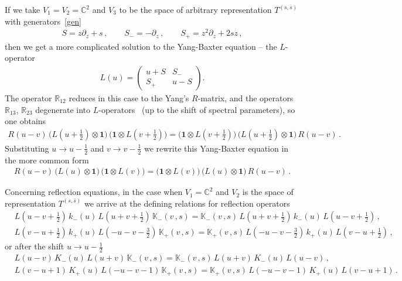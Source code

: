 \documentclass[a4paper,11pt]{article}
\numberwithin{equation}{section}
\begin{document}
If we take $V_1 = V_2 = \mathbb{C}^2$ and $V_3$ to be
the space of arbitrary representation  
$T^{(s,\bar{s})}$ with generators~\eqref{gen}
\begin{align*}
	S = z\partial_z + s \,, \qquad S_- = -\partial_z \,, \qquad 
	S_+ = z^2\partial_z+2sz \,,
\end{align*}
then we get a more complicated solution to the Yang-Baxter equation -- the $L$-operator
\begin{align} \label{L}
	L(u) =
	\left( \begin{array}{cc}
		u + S & S_{-} \\
		S_{+} & u - S \end{array} \right) .
\end{align}
The operator $\mathbb{R}_{12}$ reduces in this case to the Yang's $R$-matrix, and the operators $\mathbb{R}_{13}$, $\mathbb{R}_{23}$ degenerate into $L$-operators~\cite{DM09,CDS} (up to the shift of spectral parameters), so one obtains
\begin{align*}
	\textstyle R(u-v)\, \bigl(L(u+\frac{1}{2})\otimes \bm{1}\bigr)\, 
	\bigl(\bm{1} \otimes L(v+\frac{1}{2})\bigr)
	= \bigl(\bm{1} \otimes L(v+\frac{1}{2})\bigr)\,
	\bigl(L(u+\frac{1}{2})\otimes \bm{1}\bigr)\, R(u-v) \,.
\end{align*}
Substituting $u\to u-\frac{1}{2}$ and $v\to v-\frac{1}{2}$ we rewrite this Yang-Baxter equation in the more common form
\begin{align} \label{RLL}
	\textstyle R(u-v)\, \bigl(L(u)\otimes \bm{1}\bigr)\, 
	\bigl(\bm{1} \otimes L(v)\bigr)
	= \bigl(\bm{1} \otimes L(v)\bigr)\,
	\bigl(L(u)\otimes \bm{1}\bigr)\, R(u-v) \,.
\end{align}

Concerning reflection equations, in the case when $V_1 = \mathbb{C}^2$ and $V_2$ 
is the space of representation $T^{(s,\bar{s})}$ we arrive at the defining relations for reflection operators
\begin{align*} 
	&\textstyle L(u-v+\frac{1}{2})\,k_-(u)\,L(u+v+\frac{1}{2})\,\mathbb{K}_-(v\,,s) = 
	\mathbb{K}_-(v\,,s)\,L(u+v+\frac{1}{2})\,k_-(u)\,L(u-v+\frac{1}{2}) \,,\\
	&\textstyle L(v-u+\frac{1}{2})\,k_+(u)\,L(-u-v-\frac{3}{2})\,\mathbb{K}_+(v\,,s) = 
	\mathbb{K}_+(v\,,s)\,L(-u-v-\frac{3}{2})\,k_+(u)\,L(v-u+\frac{1}{2}) \,,
\end{align*}
or after the shift $u\to u-\frac{1}{2}$
\begin{align} \label{ReflL1}
	&\textstyle L(u-v)\,K_-(u)\,L(u+v)\,\mathbb{K}_-(v\,,s) = 
	\mathbb{K}_-(v\,,s)\,L(u+v)\,K_-(u)\,L(u-v) \,,\\
    \label{ReflL2}
	&\textstyle L(v-u+1)\,K_+(u)\,L(-u-v-1)\,\mathbb{K}_+(v\,,s) = 
	\mathbb{K}_+(v\,,s)\,L(-u-v-1)\,K_+(u)\,L(v-u+1) \,.
\end{align}
\end{document}
